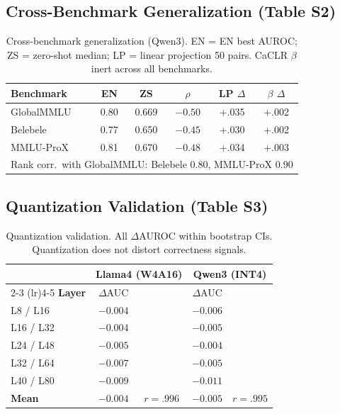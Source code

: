 \documentclass[11pt,a4paper]{article}
\begin{document}
\subsection{Cross-Benchmark Generalization (Table S2)}

\begin{table}[h]
\centering
\small
\begin{tabular}{lccccc}
\toprule
\textbf{Benchmark} & \textbf{EN} & \textbf{ZS} & $\rho$ & \textbf{LP $\Delta$} & $\beta$ $\Delta$ \\
\midrule
GlobalMMLU & 0.80 & 0.669 & $-0.50$ & +.035 & +.002 \\
Belebele & 0.77 & 0.650 & $-0.45$ & +.030 & +.002 \\
MMLU-ProX & 0.81 & 0.670 & $-0.48$ & +.034 & +.003 \\
\midrule
\multicolumn{6}{l}{\small Rank corr.\ with GlobalMMLU: Belebele 0.80, MMLU-ProX 0.90} \\
\bottomrule
\end{tabular}
\caption{Cross-benchmark generalization (Qwen3). EN = EN best AUROC; ZS = zero-shot median; LP = linear projection 50 pairs. CaCLR $\beta$ inert across all benchmarks.}
\label{tab:benchmark_supp}
\end{table}

\subsection{Quantization Validation (Table S3)}

\begin{table}[h]
\centering
\small
\begin{tabular}{lcccc}
\toprule
& \multicolumn{2}{c}{\textbf{Llama4 (W4A16)}} & \multicolumn{2}{c}{\textbf{Qwen3 (INT4)}} \\
\cmidrule(lr){2-3} \cmidrule(lr){4-5}
\textbf{Layer} & $\Delta$AUC & & $\Delta$AUC & \\
\midrule
L8 / L16 & $-0.004$ & & $-0.006$ & \\
L16 / L32 & $-0.004$ & & $-0.005$ & \\
L24 / L48 & $-0.005$ & & $-0.004$ & \\
L32 / L64 & $-0.007$ & & $-0.005$ & \\
L40 / L80 & $-0.009$ & & $-0.011$ & \\
\midrule
\textbf{Mean} & $-0.004$ & $r{=}.996$ & $-0.005$ & $r{=}.995$ \\
\bottomrule
\end{tabular}
\caption{Quantization validation. All $\Delta$AUROC within bootstrap CIs. Quantization does not distort correctness signals.}
\label{tab:quant_supp}
\end{table}
\end{document}
